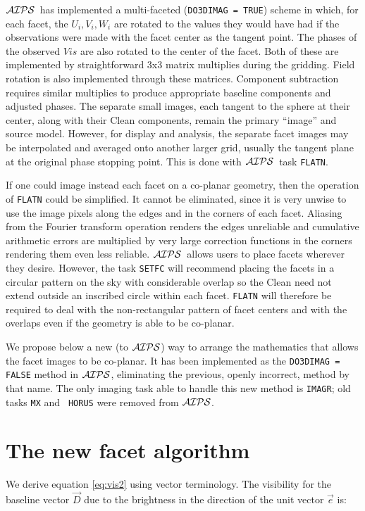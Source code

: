 \documentclass[twoside]{article}
\newcommand{\AIPS}{{$\cal AIPS\/$}}
\begin{document}
\AIPS\ has implemented a multi-faceted ({\tt DO3DIMAG = TRUE}) scheme in
which, for each facet, the $U_i, V_i, W_i$ are rotated to the values
they would have had if the observations were made with the facet
center as the tangent point.  The phases of the observed $Vis$ are
also rotated to the center of the facet.  Both of these are
implemented by straightforward 3x3 matrix multiplies during the
gridding.  Field rotation is also implemented through these matrices.
Component subtraction requires similar multiplies to produce
appropriate baseline components and adjusted phases.  The separate
small images, each tangent to the sphere at their center, along with
their Clean components, remain the primary ``image'' and source model.
However, for display and analysis, the separate facet images may be
interpolated and averaged onto another larger grid, usually the
tangent plane at the original phase stopping point.  This is done with
\AIPS\ task {\tt FLATN}\@.

If one could image instead each facet on a co-planar geometry, then
the operation of {\tt FLATN} could be simplified.  It cannot be
eliminated, since it is very unwise to use the image pixels along the
edges and in the corners of each facet.  Aliasing from the Fourier
transform operation renders the edges unreliable and cumulative
arithmetic errors are multiplied by very large correction functions in
the corners rendering them even less reliable.  \AIPS\ allows users to
place facets wherever they desire.  However, the task {\tt SETFC} will
recommend placing the facets in a circular pattern on the sky with
considerable overlap so the Clean need not extend outside an inscribed
circle within each facet.  {\tt FLATN} will therefore be required to
deal with the non-rectangular pattern of facet centers and with the
overlaps even if the geometry is able to be co-planar.

We propose below a new (to \AIPS) way to arrange the mathematics that
allows the facet images to be co-planar.  It has been implemented as
the {\tt DO3DIMAG = FALSE} method in \AIPS, eliminating the previous,
openly incorrect, method by that name.  The only imaging task able to
handle this new method is {\tt IMAGR}; old tasks {\tt MX} and {\tt
  HORUS} were removed from \AIPS\@.

\section{The new facet algorithm}

We derive equation \ref{eq:vis2} using vector terminology.  The
visibility for the baseline vector $\vec{D}$ due to the brightness in
the direction of the unit vector $\vec{e}$ is:
\end{document}
